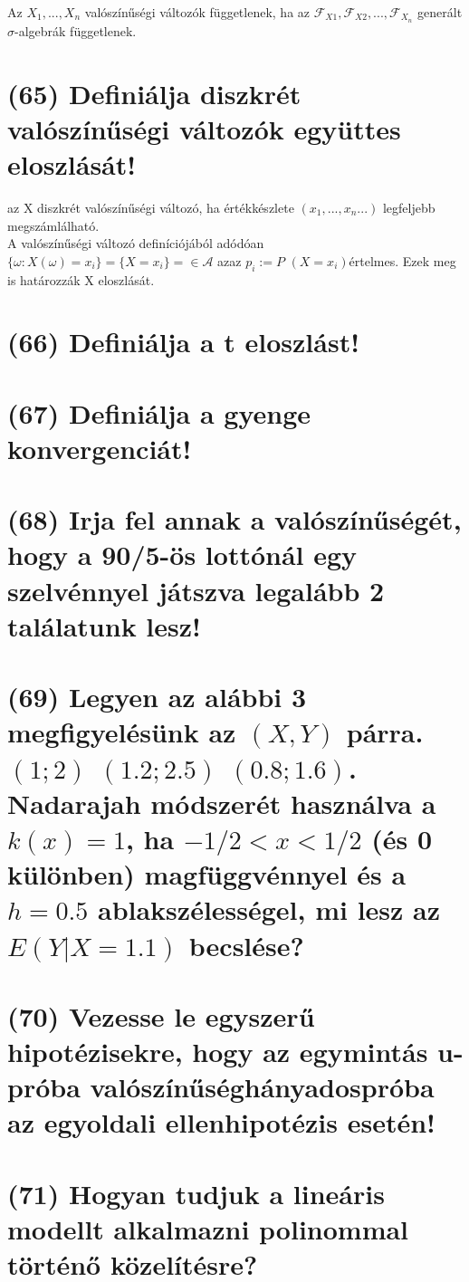 \documentclass[12p]{article}
\begin{document}
 Az $X_1,...,X_n$ valószínűségi változók függetlenek, ha az $\mathscr{F}_{X1}, \mathscr{F}_{X2} ,...,\mathscr{F}_{X_n}$ generált $\sigma$-algebrák függetlenek.

\section{(65) Definiálja diszkrét valószínűségi változók együttes eloszlását!}

az X diszkrét valószínűségi változó, ha értékkészlete $(x_1 ,..., x_n...)$ legfeljebb megszámlálható.\\
A valószínűségi változó definíciójából adódóan $\{\omega:X(\omega)= x_i\}=\{X=x_i\}= \in \mathscr{A}$ azaz $p_i:=P$ $(X=x_i)$értelmes. Ezek meg is határozzák X eloszlását.

\section{(66) Definiálja a t eloszlást!}

\section{(67) Definiálja a gyenge konvergenciát!}

\section{(68) Irja fel annak a valószínűségét, hogy a 90/5-ös lottónál egy szelvénnyel játszva legalább 2 találatunk lesz!}

\section{(69) Legyen az alábbi 3 megfigyelésünk az $(X, Y)$ párra. $(1;2)$ $(1.2;2.5)$ $(0.8;1.6)$. Nadarajah
módszerét használva a $k(x) = 1$, ha $-1/2 < x < 1/2$ (és 0 különben) magfüggvénnyel és a $h = 0.5$ ablakszélességel, mi lesz az $E(Y|X = 1.1)$ becslése?}

\section{(70) Vezesse le egyszerű hipotézisekre, hogy az egymintás u-próba valószínűséghányadospróba az egyoldali ellenhipotézis esetén!}

\section{(71) Hogyan tudjuk a lineáris modellt alkalmazni polinommal történő közelítésre?}
\end{document}
